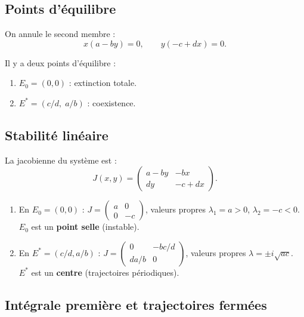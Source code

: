 \subsection{Points d'\'equilibre}

On annule le second membre :
\[
  x(a-by)=0, \qquad y(-c+dx)=0.
\]

\begin{proposition}
Il y a deux points d'\'equilibre :
\begin{enumerate}
  \item $E_0 = (0,0)$ : extinction totale.
  \item $E^* = (c/d,\;a/b)$ : coexistence.
\end{enumerate}
\end{proposition}

\subsection{Stabilit\'e lin\'eaire}

La jacobienne du syst\`eme est :
\[
  J(x,y) = \begin{pmatrix}
    a-by & -bx \\ dy & -c+dx
  \end{pmatrix}.
\]

\begin{theoreme}
\begin{enumerate}
  \item En $E_0=(0,0)$ : $J = \begin{pmatrix}a&0\\0&-c\end{pmatrix}$,
    valeurs propres $\lambda_1=a>0$, $\lambda_2=-c<0$.
    $E_0$ est un \textbf{point selle} (instable).
  \item En $E^*=(c/d,a/b)$ : $J = \begin{pmatrix}0&-bc/d\\da/b&0\end{pmatrix}$,
    valeurs propres $\lambda=\pm i\sqrt{ac}$.
    $E^*$ est un \textbf{centre} (trajectoires p\'eriodiques).
\end{enumerate}
\end{theoreme}

\subsection{Int\'egrale premi\`ere et trajectoires ferm\'ees}

